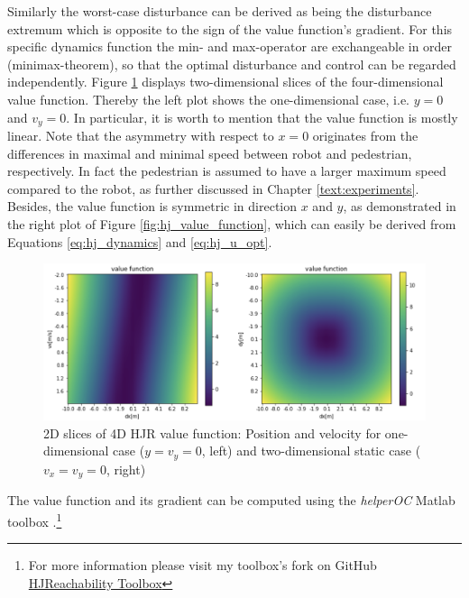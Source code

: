 Similarly the worst-case disturbance can be derived as being the disturbance extremum which is opposite to the sign of the value function's gradient. For this specific  dynamics function the min- and max-operator are exchangeable in order (minimax-theorem), so that the optimal disturbance and control can be regarded independently.
\newline
Figure \ref{img:hj_value_function} displays two-dimensional slices of the four-dimensional value function. Thereby the left plot shows the one-dimensional case, i.e. $y = 0$ and $v_y = 0$. In particular, it is worth to mention that the value function is mostly linear. Note that the asymmetry with respect to $x = 0$ originates from the differences in maximal and minimal speed between robot and pedestrian, respectively.  In fact the pedestrian is assumed to have a larger maximum speed compared to the robot, as further discussed in Chapter \ref{text:experiments}. Besides, the value function is symmetric in direction $x$ and $y$, as demonstrated in the right plot of Figure \ref{fig:hj_value_function}, which can easily be derived from Equations \ref{eq:hj_dynamics} and \ref{eq:hj_u_opt}.

\begin{figure}[!ht]
\begin{center}
\includegraphics[width=\imgwidth]{images/hj_value_function.png}
\caption{2D slices of 4D \ac{HJR} value function: Position and velocity for one-dimensional case ($y = v_y = 0$, left) and two-dimensional static case ($v_x = v_y = 0$, right)}
\label{img:hj_value_function}
\end{center}
\end{figure}

The value function and its gradient can be computed using the \textit{helperOC} Matlab toolbox \cite{Bansal2017}.\footnote{For more information please visit my toolbox's fork on GitHub \href{https://github.com/simon-schaefer/HJReachibility}{HJReachability Toolbox}}

